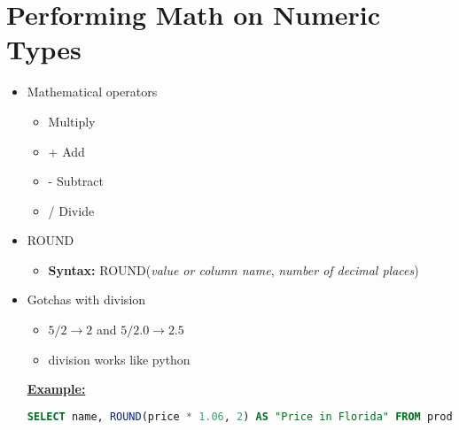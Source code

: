 \documentclass[12pt]{article}
\begin{document}
\section{Performing Math on Numeric Types}

\bigskip

\begin{itemize}
    \item Mathematical operators
    \begin{itemize}
        \item \* Multiply
        \item + Add
        \item - Subtract
        \item / Divide
    \end{itemize}
    \item ROUND
    \begin{itemize}
        \item \textbf{Syntax:} ROUND(\textit{value or column name}, \textit{number of decimal places})
    \end{itemize}
    \item Gotchas with division
    \begin{itemize}
        \item $5 / 2 \to 2$ and $5 / 2.0 \to 2.5$
        \item division works like python
    \end{itemize}

    \bigskip

    \underline{\textbf{Example:}}

    \bigskip

    \begin{lstlisting}[language=SQL]
    SELECT name, ROUND(price * 1.06, 2) AS "Price in Florida" FROM products;
    \end{lstlisting}

\end{itemize}
\end{document}
